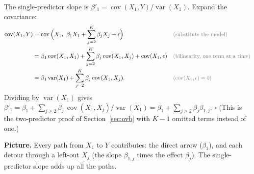 \documentclass[11pt]{article}
\newcommand{\E}{\mathbb{E}}
\newcommand{\Var}{\operatorname{var}}
\newcommand{\Cov}{\operatorname{cov}}
\newcommand{\why}[1]{&&\text{\small\color{gray}(#1)}}
\begin{document}
\begin{examplebox}[title={Question (10/21): derive the formula, assuming $\E[X_j]=0$ and $\beta_0=0$ (so $\E[Y]=0$)}]
The single-predictor slope is $\beta'_1=\Cov(X_1,Y)/\Var(X_1)$. Expand the covariance:
\begin{align*}
\Cov(X_1,Y)&=\Cov\Big(X_1,\ \beta_1X_1+\sum_{j=2}^K\beta_jX_j+\epsilon\Big) \why{substitute the model}\\
&=\beta_1\Cov(X_1,X_1)+\sum_{j=2}^K\beta_j\Cov(X_1,X_j)+\Cov(X_1,\epsilon) \why{bilinearity, one term at a time}\\
&=\beta_1\Var(X_1)+\sum_{j=2}^K\beta_j\Cov(X_1,X_j). \why{$\Cov(X_1,\epsilon)=0$}
\end{align*}
Dividing by $\Var(X_1)$ gives $\beta'_1=\beta_1+\sum_{j\ge2}\beta_j\,\Cov(X_1,X_j)/\Var(X_1)=\beta_1+\sum_{j\ge2}\beta_j\beta_{1,j}$. $\square$
(This is the two-predictor proof of Section~\ref{sec:ovb} with $K-1$ omitted terms instead of one.)
\end{examplebox}

\textbf{Picture.} Every path from $X_1$ to $Y$ contributes: the direct arrow ($\beta_1$), and each detour through a left-out $X_j$ (the slope
$\beta_{1,j}$ times the effect $\beta_j$). The single-predictor slope adds up all the paths.
\begin{center}
\end{center}
\end{document}
